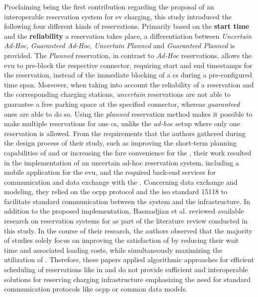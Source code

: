 Proclaiming being the first contribution regarding the proposal of an interoperable reservation system for \acrshort{ev} charging, this study introduced the following four different kinds of reservations. Primarily based on the \textbf{start time} and the \textbf{reliability} a reservation takes place, a differentiation between \textit{Uncertain Ad-Hoc}, \textit{Guaranteed Ad-Hoc}, \textit{Uncertain Planned} and \textit{Guaranteed Planned} is provided.
The \textit{Planned} reservation, in contrast to \textit{Ad-Hoc} reservations, allows the \acrshort{evu} to pre-block the respective connector, requiring start and end timestamps for the reservation, instead of the immediate blocking of a \acrshort{cs} during a pre-configured time span. 
Moreover, when taking into account the reliability of a reservation and the corresponding charging stations, \textit{uncertain} reservations are not able to guarantee a free parking space at the specified connector, whereas \textit{guaranteed} ones are able to do so.
Using the \textit{planned} reservation method makes it possible to make multiple reservations for one \acrshort{cs}, unlike the \textit{ad-hoc} setup where only one reservation is allowed.
From the requirements that the authors gathered during the design process of their study, such as improving the short-term planning capabilities of  and  or increasing the fare convenience for the , their work resulted in the implementation of an uncertain ad-hoc reservation system, including a mobile application for the \acrshort{evu}, and the required back-end services for communication and data exchange with the .
Concerning data exchange and modeling, they relied on the \acrshort{ocpp} protocol and the \acrshort{iso} standard 15118 to facilitate standard communication between the system and the infrastructure.
In addition to the proposed implementation, Basmadjian et al. reviewed available research on reservation systems for  as part of the literature review conducted in this study.
In the course of their research, the authors observed that the majority of studies solely focus on improving the satisfaction of  by reducing their wait time and associated loading costs, while simultaneously maximizing the utilization of .
Therefore, these papers applied algorithmic approaches for efficient scheduling of reservations like in \cite{kim_efficient_2010,xiang_reservation-based_2011,qin_charging_2011} and do not provide sufficient and interoperable solutions for reserving charging infrastructure emphasizing the need for standard communication protocols like \acrshort{ocpp} or common data models. 
